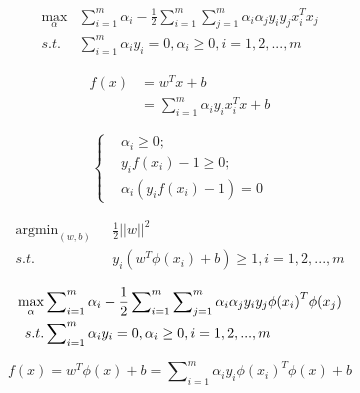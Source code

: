 \documentclass{article}
\begin{document}
\begin{equation}\label{alpha}
\begin{split}
     \mathop{\max}_{\alpha} & \sum\nolimits_{i = 1}^{m} \alpha_i - \frac{1}{2} \sum\nolimits_{i=1}^{m}\sum\nolimits_{j=1}^{m} \alpha_i \alpha_j y_i y_jx_i^Tx_j \\
     s.t. & \sum\nolimits_{i=1}^{m}\alpha_iy_i = 0, \alpha_i \geq 0, i = 1,2,...,m
\end{split}
\end{equation}

\begin{equation}\label{model}
\begin{split}
   f(x) & = w^Tx + b \\
     & = \sum\nolimits_{i=1}^{m}\alpha_iy_ix_i^Tx+b
\end{split}
\end{equation}


\begin{equation}\label{constraints}
  \left\{ \begin{aligned}
            & \alpha_i \geq 0; \\
            & y_if(x_i) -1 \geq 0; \\
            & \alpha_i(y_if(x_i) -1) = 0
          \end{aligned}\right.
\end{equation}

\begin{equation}\label{tt}
\begin{aligned}
   \mathop{\arg\min}_{(w,b)}  &  \text{ }\frac{1}{2}{||w||}^2 \\
  s.t. & \text{ }  y_i(w^T\phi(x_i) + b) \geq 1, i = 1,2,...,m
\end{aligned}
\end{equation}

\begin{equation}\label{ttd}
\begin{aligned}
  \mathop{\max}_{\alpha} & \space \sum\nolimits_{i = 1}^{m} \alpha_i - \frac{1}{2} \sum\nolimits_{i=1}^{m}\sum\nolimits_{j=1}^{m} \alpha_i \alpha_j y_i y_j{\phi(x_i)}^T\phi(x_j) \\
     s.t. &\space \sum\nolimits_{i=1}^{m}\alpha_iy_i = 0, \alpha_i \geq 0, i = 1,2,...,m
\end{aligned}
\end{equation}

\begin{equation}\label{predd}
  f(x) = w^T\phi(x) + b = \sum\nolimits_{i=1}^{m}\alpha_iy_i{\phi(x_i)}^T\phi(x) + b
\end{equation}
\end{document}
